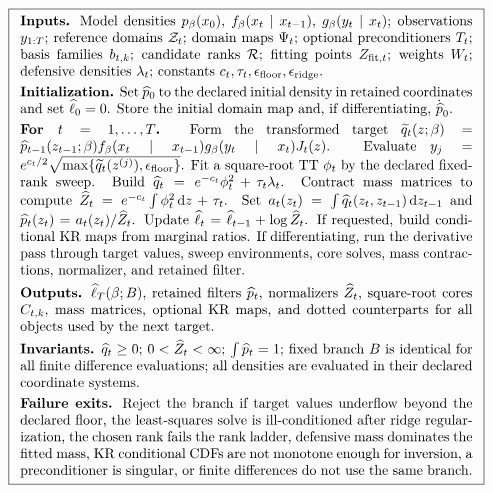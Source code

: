 \documentclass[11pt]{article}
\newcommand{\dd}{\,\mathrm d}
\begin{document}
\[
\boxed{
\begin{array}{p{0.94\linewidth}}
\textbf{Inputs.}
Model densities \(p_\beta(x_0)\), \(f_\beta(x_t\mid x_{t-1})\),
\(g_\beta(y_t\mid x_t)\); observations \(y_{1:T}\); reference domains
\(\mathcal Z_t\); domain maps \(\Psi_t\); optional preconditioners \(T_t\);
basis families \(b_{t,k}\); candidate ranks \(\mathcal R\); fitting points
\(Z_{{\rm fit},t}\); weights \(W_t\); defensive densities \(\lambda_t\);
constants \(c_t,\tau_t,\epsilon_{\rm floor},\epsilon_{\rm ridge}\).
\\[1mm]
\textbf{Initialization.}
Set \(\widehat p_0\) to the declared initial density in retained coordinates
and set \(\widehat\ell_0=0\).  Store the initial domain map and, if
differentiating, \(\dot{\widehat p}_0\).
\\[1mm]
\textbf{For \(t=1,\ldots,T\).}
Form the transformed target
\(\widetilde q_t(z;\beta)=\widehat p_{t-1}(z_{t-1};\beta)
f_\beta(x_t\mid x_{t-1})g_\beta(y_t\mid x_t)J_t(z)\).
Evaluate \(y_j=e^{c_t/2}\sqrt{\max\{\widetilde q_t(z^{(j)}),\epsilon_{\rm floor}\}}\).
Fit a square-root TT \(\phi_t\) by the declared fixed-rank sweep.
Build
\(\widehat q_t=e^{-c_t}\phi_t^2+\tau_t\lambda_t\).
Contract mass matrices to compute
\(\widehat Z_t=e^{-c_t}\int\phi_t^2\dd z+\tau_t\).
Set
\(a_t(z_t)=\int \widehat q_t(z_t,z_{t-1})\dd z_{t-1}\) and
\(\widehat p_t(z_t)=a_t(z_t)/\widehat Z_t\).
Update \(\widehat\ell_t=\widehat\ell_{t-1}+\log\widehat Z_t\).
If requested, build conditional KR maps from marginal ratios.
If differentiating, run the derivative pass through target values, sweep
environments, core solves, mass contractions, normalizer, and retained filter.
\\[1mm]
\textbf{Outputs.}
\(\widehat\ell_T(\beta;B)\), retained filters
\(\widehat p_t\), normalizers \(\widehat Z_t\), square-root cores \(C_{t,k}\),
mass matrices, optional KR maps, and dotted counterparts for all objects used
by the next target.
\\[1mm]
\textbf{Invariants.}
\(\widehat q_t\ge0\); \(0<\widehat Z_t<\infty\);
\(\int \widehat p_t=1\); fixed branch \(B\) is identical for all finite
difference evaluations; all densities are evaluated in their declared
coordinate systems.
\\[1mm]
\textbf{Failure exits.}
Reject the branch if target values underflow beyond the declared floor,
the least-squares solve is ill-conditioned after ridge regularization, the
chosen rank fails the rank ladder, defensive mass dominates the fitted mass,
KR conditional CDFs are not monotone enough for inversion, a preconditioner is
singular, or finite differences do not use the same branch.
\end{array}}
\label{eq:p24-boxed-filter}
\]
\end{document}
